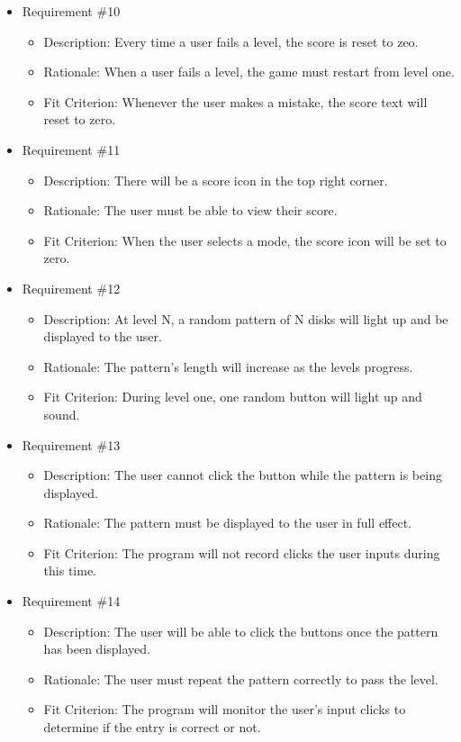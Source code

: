 \documentclass[12pt, titlepage]{article}
\begin{document}
\begin{itemize}
\item Requirement \#10
\begin{itemize}
\item Description: Every time a user fails a level, the score is reset to zeo.
\item Rationale: When a user fails a level, the game must restart from level one.
\item Fit Criterion: Whenever the user makes a mistake, the score text will reset to zero.
\end{itemize}

\item Requirement \#11
\begin{itemize}
\item Description: There will be a score icon in the top right corner.
\item Rationale: The user must be able to view their score.
\item Fit Criterion: When the user selects a mode, the score icon will be set to zero.
\end{itemize}

\item Requirement \#12
\begin{itemize}
\item Description: At level N, a random pattern of N disks will light up and be displayed to the user.
\item Rationale: The pattern's length will increase as the levels progress.
\item Fit Criterion: During level one, one random button will light up and sound.
\end{itemize}

\item Requirement \#13
\begin{itemize}
\item Description: The user cannot click the button while the pattern is being displayed. 
\item Rationale: The pattern must be displayed to the user in full effect.
\item Fit Criterion: The program will not record clicks the user inputs during this time.
\end{itemize}

\item Requirement \#14
\begin{itemize}
\item Description: The user will be able to click the buttons once the pattern has been displayed. 
\item Rationale: The user must repeat the pattern correctly to pass the level.
\item Fit Criterion: The program will monitor the user's input clicks to determine if the entry is correct or not.
\end{itemize}


\end{itemize}
\end{document}

